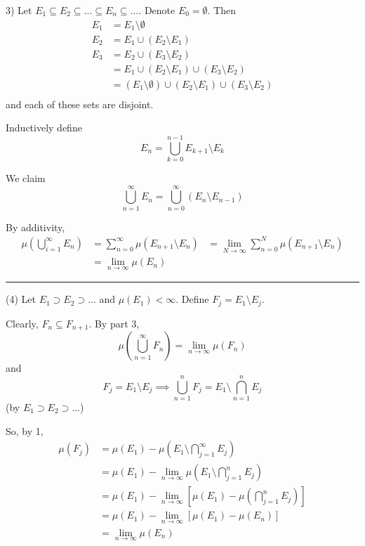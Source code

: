 \documentclass[12pt]{report}
\newcommand{\sub}{\subseteq}
\renewcommand{\div}{\vspace*{10pt}\hrule\vspace*{10pt}}
\newenvironment*{tbox}[2][gray]{
    \begin{tcolorbox}[
        parbox=false,
        colback=#1!5!white,
        colframe=#1!75!black,
        breakable,
        title={#2}
    ]}
    {\end{tcolorbox}}
\begin{document}
\begin{tbox}
            (3) Let $E_1 \sub E_2 \sub \dots \sub E_n \sub \dots$. Denote $E_0 = \emptyset$. Then 
            \begin{align*}
                E_1 &= E_1 \setminus \emptyset\\
                E_2 &= E_1 \cup (E_2 \setminus E_1)\\
                E_3 &= E_2 \cup (E_3 \setminus E_2)\\
                &= E_1 \cup (E_2 \setminus E_1) \cup (E_3 \setminus E_2)\\
                &= (E_1 \setminus \emptyset) \cup (E_2 \setminus E_1) \cup (E_3 \setminus E_2)\\
            \end{align*}
            and each of these sets are disjoint. 

            Inductively define 
            \[E_n = \bigcup_{k=0}^{n-1} E_{k+1}\setminus E_{k}\]

            We claim 
            \[\bigcup_{n=1}^{\infty} E_n = \bigcup_{n=0}^{\infty} (E_n \setminus E_{n-1})\]

            By additivity, 
            \begin{align*}
                \mu\left(\bigcup_{i=1}^\infty E_n\right) &= \sum_{n=0}^{\infty} \mu(E_{n+1} \setminus E_{n})
                    &= \lim_{N \to \infty} \sum_{n=0}^N \mu(E_{n+1} \setminus E_{n})\\ 
                    &=  \lim_{n \to \infty} \mu(E_n)
            \end{align*}

            \div 

            (4) Let $E_1 \supset E_2 \supset \dots$ and $\mu(E_1) < \infty$. Define $F_j = E_1 \setminus E_j$. 

            Clearly, $F_n \sub F_{n+1}$. By part 3, 
            \[\mu\left(\bigcup_{n=1}^\infty F_n\right) = \lim_{n\to \infty} \mu(F_n)\]
            and 
            \[F_j = E_1 \setminus E_j \implies \bigcup_{n=1}^n F_j = E_1 \setminus \bigcap_{n=1}^n E_j\]
            (by $E_1 \supset E_2 \supset \dots$)

            So, by 1, 
            \begin{align*}
                \mu(F_j) &= \mu(E_1) - \mu\left(E_1 \setminus \bigcap_{j=1}^{\infty} E_j\right)\\ 
                    &=\mu(E_1) - \lim_{n\to \infty} \mu\left(E_1 \setminus \bigcap_{j=1}^n E_j\right)\\ 
                    &= \mu(E_1) - \lim_{n \to \infty} \left[\mu(E_1) - \mu(\bigcap_{j=1}^n E_j)\right]\\ 
                    &= \mu(E_1) - \lim_{n \to \infty} \left[\mu(E_1) - \mu(E_n)\right]\\ 
                    &= \lim_{n \to \infty} \mu(E_n)
            \end{align*}
        \end{tbox}
\end{document}

